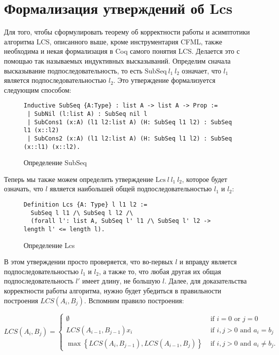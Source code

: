 \section{Формализация утверждений об Lcs}
Для того, чтобы сформулировать теорему об корректности работы и асимптотики алгоритма LCS, описанного выше, кроме инструментария
CFML, также необходима и некая формализация в Coq самого понятия LCS. Делается это с помощью так называемых индуктивных высказываний.
Определим сначала высказывание подпоследовательность, то есть $\text{SubSeq}\ l_1\ l_2$ означает, что $l_1$ является подпоследовательностью
$l_2$. Это утверждение формализуется следующим способом:


\begin{figure}[H]
  \caption{Определение SubSeq}
  \label{code:subseq_prop}
  \begin{verbatim}
Inductive SubSeq {A:Type} : list A -> list A -> Prop :=
 | SubNil (l:list A) : SubSeq nil l
 | SubCons1 (x:A) (l1 l2:list A) (H: SubSeq l1 l2) : SubSeq l1 (x::l2)
 | SubCons2 (x:A) (l1 l2:list A) (H: SubSeq l1 l2) : SubSeq (x::l1) (x::l2).
  \end{verbatim}
\end{figure}

Теперь мы также можем определить утверждение $\text{Lcs}\ l\ l_1\ l_2$, которое будет означать, что $l$ является наибольшей
общей подпоследовательностью $l_1$ и $l_2$:

\begin{figure}[H]
  \caption{Определение Lcs}
  \label{code:lcs_prop}
  \begin{verbatim}
Definition Lcs {A: Type} l l1 l2 :=
  SubSeq l l1 /\ SubSeq l l2 /\ 
  (forall l': list A, SubSeq l' l1 /\ SubSeq l' l2 -> length l' <= length l). 
  \end{verbatim}
\end{figure}

В этом утверждении просто проверяется, что во-первых $l$ и вправду является подпоследовательностью $l_1$ и $l_2$, а также то,
что любая другая их общая подпоследовательность $l'$ имеет длину, не большую $l$. Далее, для доказательства корректности работы
алгоритма, нужно будет убедиться в правильности построения $LCS(A_i, B_j)$. Вспомним правило построения:

$$
  L C S\left(A_{i}, B_{j}\right)=\left\{\begin{array}{ll}
    \emptyset                                                                              & \text { if } i=0 \text { or } j=0                    \\
    L C S\left(A_{i-1}, B_{j-1}\right) x_{i}                                               & \text { if } i, j>0 \text { and } a_{i}=b_{j}        \\
    \max \left\{L C S\left(A_{i}, B_{j-1}\right), L C S\left(A_{i-1}, B_{j}\right)\right\} & \text { if } i, j>0 \text { and } a_{i} \neq b_{j} .
  \end{array}\right.
$$

